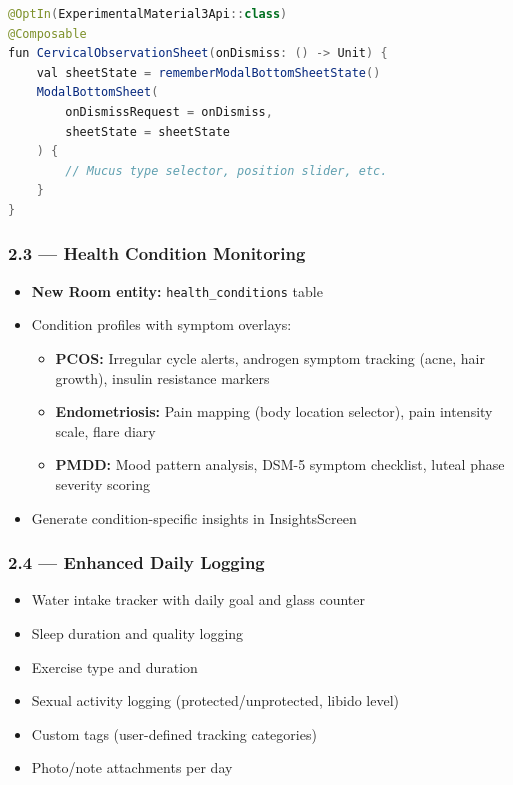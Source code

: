 \documentclass[12pt,a4paper]{article}
\begin{document}
\begin{lstlisting}[language=Java, caption=ModalBottomSheet for cervical tracking (from Context7)]
@OptIn(ExperimentalMaterial3Api::class)
@Composable
fun CervicalObservationSheet(onDismiss: () -> Unit) {
    val sheetState = rememberModalBottomSheetState()
    ModalBottomSheet(
        onDismissRequest = onDismiss,
        sheetState = sheetState
    ) {
        // Mucus type selector, position slider, etc.
    }
}
\end{lstlisting}

\subsubsection{2.3 — Health Condition Monitoring}
\begin{itemize}[leftmargin=1.5em]
  \item \textbf{New Room entity:} \texttt{health\_conditions} table
  \item Condition profiles with symptom overlays:
  \begin{itemize}
    \item \textbf{PCOS:} Irregular cycle alerts, androgen symptom tracking (acne, hair growth), insulin resistance markers
    \item \textbf{Endometriosis:} Pain mapping (body location selector), pain intensity scale, flare diary
    \item \textbf{PMDD:} Mood pattern analysis, DSM-5 symptom checklist, luteal phase severity scoring
  \end{itemize}
  \item Generate condition-specific insights in InsightsScreen
\end{itemize}

\subsubsection{2.4 — Enhanced Daily Logging}
\begin{itemize}[leftmargin=1.5em]
  \item Water intake tracker with daily goal and glass counter
  \item Sleep duration and quality logging
  \item Exercise type and duration
  \item Sexual activity logging (protected/unprotected, libido level)
  \item Custom tags (user-defined tracking categories)
  \item Photo/note attachments per day
\end{itemize}
\end{document}
